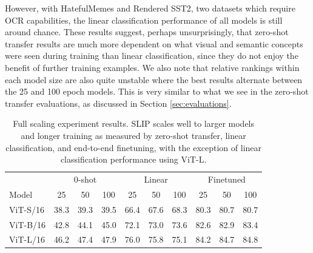 \documentclass[10pt,twocolumn,letterpaper]{article}
\newcommand{\tablestyle}[2]{\setlength{\tabcolsep}{#1}\renewcommand{\arraystretch}{#2}\centering\footnotesize}
\begin{document}
However, with HatefulMemes and Rendered SST2, two datasets which require OCR capabilities, the linear classification performance of all models is still around chance.
These results suggest, perhaps unsurprisingly, that zero-shot transfer results are much more dependent on what visual and semantic concepts were seen during training than linear classification, since they do not enjoy the benefit of further training examples.
We also note that relative rankings within each model size are also quite unstable where the best results alternate between the 25 and 100 epoch models.
This is very similar to what we see in the zero-shot transfer evaluations, as discussed in Section \ref{sec:evaluations}.

\begin{table}[hbt]
\tablestyle{4pt}{1.1}
\begin{tabular}{l | ccc | ccc | ccc} 
& \multicolumn{3}{c}{0-shot} & \multicolumn{3}{c}{Linear} & \multicolumn{3}{c}{Finetuned} \\
Model & 25 & 50 & 100 & 25 & 50 & 100 & 25 & 50 & 100 \\
\shline
ViT-S/16	&	38.3	&	39.3	&	39.5	&	66.4	&	67.6	&	68.3	&	80.3	&	80.7	&	80.7	\\
ViT-B/16	&	42.8	&	44.1	&	45.0	&	72.1	&	73.0	&	73.6	&	82.6	&	82.9	&	83.4	\\
ViT-L/16	&	46.2	&	47.4	&	47.9	&	76.0	&	75.8	&	75.1	&	84.2	&	84.7	&	84.8	\\
\end{tabular}
\caption{Full scaling experiment results.
SLIP scales well to larger models and longer training as measured by zero-shot transfer, linear classification, and end-to-end finetuning, with the exception of linear classification performance using ViT-L.
}
\label{tab:full-scaling}
\end{table}
\end{document}
